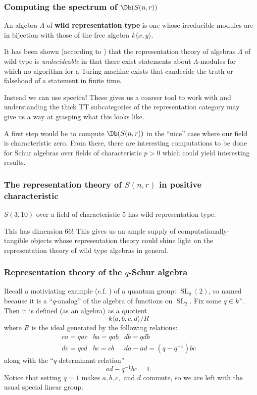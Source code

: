 \documentclass[12pt]{article}
\begin{document}
		\subsubsection{Computing the spectrum of \texorpdfstring{$\Db(S(n,r))$}{DbS(n,r)}}
		\begin{defn}
			An algebra $\Lambda$ of \textbf{wild representation type} is one whose irreducible 
			modules are in bijection with those of the free algebra $k\langle x,y\rangle$.
		\end{defn}
		\begin{thm} 
			It has been shown (according to \cite{bensonI}) that the representation theory of 
			algebras $\Lambda$ of wild type is \textit{undecideable} in that there exist statements about $\Lambda$-modules for which no algorithm for a Turing machine exists
			that candecide the truth or falsehood of a statement in finite time.
		\end{thm} 

		Instead we can use spectra! These gives us a coarser tool to work with and understanding the thick TT subcategories of 
		the representation category may give us a way at grasping what this looks like.

		A first step would be to compute $\Db(S(n,r))$ in the ``nice'' case where our field is characteristic zero. From there, there are interesting computations to be done 
		for Schur algebras over fields of characteristic $p>0$ which could yield interesting results.

		\subsubsection{The representation theory of \texorpdfstring{$S(n,r)$}{S(n,r)} in positive characteristic}
		\begin{thm}
			$S(3,10)$ over a field of characteristic 5 has wild representation type.
		\end{thm}

		This has dimension 66! This gives us an ample supply of computationally-tangible objects whose representation theory 
		could shine light on the representation theory of wild type algebras in general.

		\subsubsection{Representation theory of the \texorpdfstring{$q$}{q}-Schur algebra}
		Recall a motiviating example (c.f. \cite{majid}) of a quantum group: $\operatorname{SL}_q(2)$, so named because it is a ``$q$-analog'' of the algebra of functions on
		$\operatorname{SL}_2$. Fix some $q\in k^\times$. Then it is defined (as an algebra) as a quotient 
		\[k\langle a,b,c,d\rangle/R\]
		where $R$ is the ideal generated by the following relations:
		\[\begin{array}{ccc}
			ca=qac & ba=qab & db=qdb\\
			dc=qcd & bc=cb & da-ad=(q-q^{-1})bc
		\end{array}\]
		along with the ``$q$-determinant relation''
		\[ad-q^{-1}bc=1.\]
		Notice that setting $q=1$ makes $a,b,c,$ and $d$ commute, so we are left with the usual special linear group.
\end{document}
